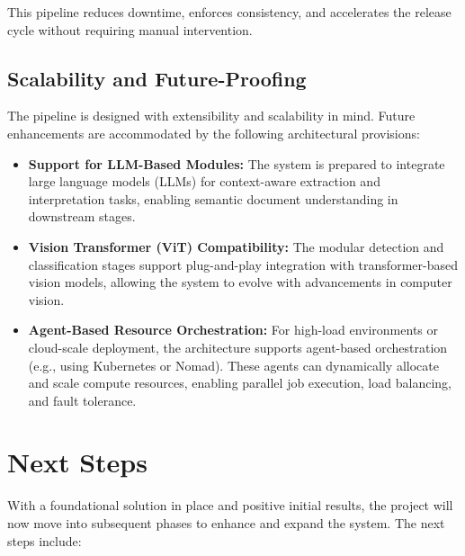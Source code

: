 \documentclass[11pt,a4paper]{article}
\begin{document}
This pipeline reduces downtime, enforces consistency, and accelerates the release cycle without requiring manual intervention.

\subsection{Scalability and Future-Proofing}

The pipeline is designed with extensibility and scalability in mind. Future enhancements are accommodated by the following architectural provisions:

\begin{itemize}
    \item \textbf{Support for LLM-Based Modules:} The system is prepared to integrate large language models (LLMs) for context-aware extraction and interpretation tasks, enabling semantic document understanding in downstream stages.
    \item \textbf{Vision Transformer (ViT) Compatibility:} The modular detection and classification stages support plug-and-play integration with transformer-based vision models, allowing the system to evolve with advancements in computer vision.
    \item \textbf{Agent-Based Resource Orchestration:} For high-load environments or cloud-scale deployment, the architecture supports agent-based orchestration (e.g., using Kubernetes or Nomad). These agents can dynamically allocate and scale compute resources, enabling parallel job execution, load balancing, and fault tolerance.
\end{itemize}


\section{Next Steps}
With a foundational solution in place and positive initial results, the project will now move into subsequent phases to enhance and expand the system. The next steps include:
\end{document}

